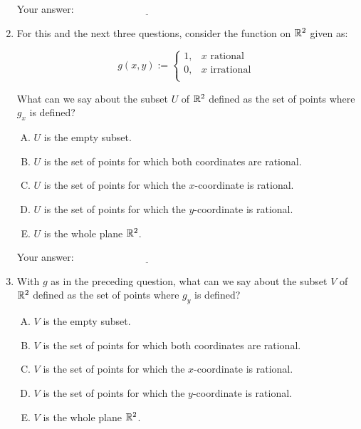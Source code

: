 \documentclass[10pt]{amsart}
\begin{document}
\begin{enumerate}
  \vspace{0.05in}
  Your answer: $\underline{\qquad\qquad\qquad\qquad\qquad\qquad\qquad}$
  \vspace{0.05in}

\item For this and the next three questions, consider the function on $\mathbb{R}^2$
  given as:

  $$g(x,y) := \left\lbrace \begin{array}{rl} 1, & x \text{ rational}\\0, & x \text{ irrational } \\\end{array}\right.$$

  What can we say about the subset $U$ of $\mathbb{R}^2$ defined as the set of
  points where $g_x$ is defined?

  \begin{enumerate}[(A)]
  \item $U$ is the empty subset.
  \item $U$ is the set of points for which both coordinates are rational.
  \item $U$ is the set of points for which the $x$-coordinate is rational.
  \item $U$ is the set of points for which the $y$-coordinate is rational.
  \item $U$ is the whole plane $\mathbb{R}^2$.
  \end{enumerate}

  \vspace{0.05in}
  Your answer: $\underline{\qquad\qquad\qquad\qquad\qquad\qquad\qquad}$
  \vspace{0.05in}

\item With $g$ as in the preceding question, what can we say about the
  subset $V$ of $\mathbb{R}^2$ defined as the set of points where $g_y$ is
  defined?

  \begin{enumerate}[(A)]
  \item $V$ is the empty subset.
  \item $V$ is the set of points for which both coordinates are rational.
  \item $V$ is the set of points for which the $x$-coordinate is rational.
  \item $V$ is the set of points for which the $y$-coordinate is rational.
  \item $V$ is the whole plane $\mathbb{R}^2$.
  \end{enumerate}


\end{enumerate}
\end{document}
